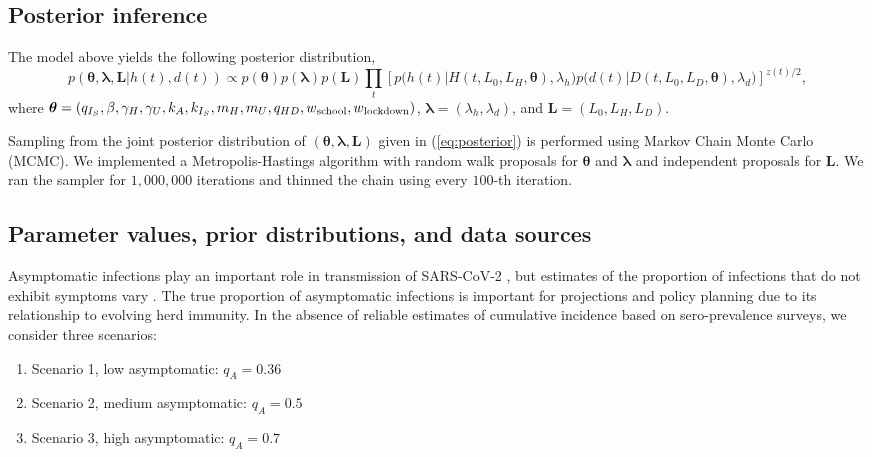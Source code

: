 \documentclass[11pt]{article}
\newcommand{\bL}{\mathbf{L}}
\newcommand{\btheta}{\boldsymbol{\theta}}
\newcommand{\blambda}{\boldsymbol{\lambda}}
\begin{document}
\subsection{Posterior inference} 

The model above yields the following posterior distribution,
\begin{equation}
p(\btheta, \blambda, \bL | h(t), d(t)) \propto p(\btheta) p(\blambda) p(\bL)
							 \prod_t \left[ p\big(h(t)| H(t, L_0, L_H, \btheta), \lambda_h \big)
							         p\big(d(t)| D(t, L_0, L_D, \btheta), \lambda_d \big) \right]^{z(t)/2},
\label{eq:posterior}
\end{equation}
where $\btheta = (q_{I_S}, \beta, \gamma_H, \gamma_U, k_A, k_{I_S}, m_H, m_U, q_{HD}, w\textsubscript{school}, w\textsubscript{lockdown})$, $\blambda = (\lambda_h, \lambda_d)$, and $\bL = (L_0, L_H, L_D)$.

Sampling from the joint posterior distribution of $(\btheta, \blambda, \bL)$  given in (\ref{eq:posterior}) is performed using Markov Chain Monte Carlo (MCMC). We implemented a Metropolis-Hastings algorithm with random walk proposals for $\btheta$ and $\blambda$ and independent proposals for $\bL$. We ran the sampler for $1,000,000$ iterations and thinned the chain using every $100$-th iteration.




\subsection{Parameter values, prior distributions, and data sources}

Asymptomatic infections play an important role in transmission of SARS-CoV-2 \citep{furukawa2020evidence, liu2020contribution, emery2020contribution, he2020temporal}, but estimates of the proportion of infections that do not exhibit symptoms vary \citep{he2020estimation, nishiura2020estimation, mizumoto2020estimating, emery2020contribution, lavezzo2020suppression, campbell2020prevalence}. The true proportion of asymptomatic infections is important for projections and policy planning due to its relationship to evolving herd immunity. In the absence of reliable estimates of cumulative incidence based on sero-prevalence surveys, we consider three scenarios: 

\begin{enumerate}
	\item Scenario 1, low asymptomatic: $q_A = 0.36$
	\item Scenario 2, medium asymptomatic: $q_A = 0.5$
	\item Scenario 3, high asymptomatic: $q_A = 0.7$
\end{enumerate}
\end{document}
